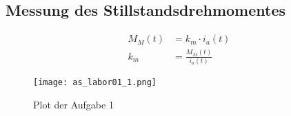 \subsection{Messung des Stillstandsdrehmomentes}


\begin{equation} \label{eq111}
    \begin{split}
        M_M(t)&=k_m \cdot i_a(t)\\
        k_m&=\frac{M_M(t)}{i_a(t)}
    \end{split}
\end{equation}


\begin{figure}[H]
 \centering
 \texttt{[image: as\_labor01\_1.png]}
 \caption{Plot der Aufgabe 1}
 \label{fig:PlotAufgabe1}
\end{figure}